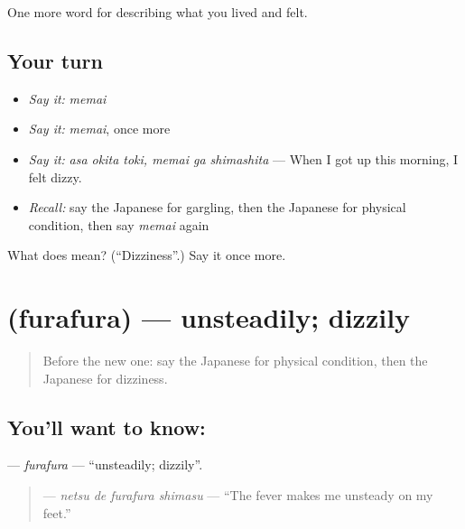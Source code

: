 \begin{grammarlens}[title={What you've built}]
One more word for describing what you lived and felt.
\end{grammarlens}

\subsection*{Your turn}
\begin{itemize}
\raggedright
  \item \emph{Say it:} \emph{memai}
  \item \emph{Say it:} \emph{memai}, once more
  \item \emph{Say it:} \emph{asa okita toki, memai ga shimashita} — When I got up this morning, I felt dizzy.
  \item \emph{Recall:} say the Japanese for gargling, then the Japanese for physical condition, then say \emph{memai} again
\end{itemize}

\begin{tcolorbox}[breakable,colback=teal!4,colframe=teal!35!black,title={Before you move on}]
What does  mean? (\textquotedblleft{}Dizziness\textquotedblright{}.) Say it once more.
\end{tcolorbox}
\section[\texorpdfstring{\ja{ふらふら} (furafura)}{ふらふら (furafura)}]{ (furafura) — unsteadily; dizzily}

\label{lesson:JA-C447-furafura}



\begin{quote}
Before the new one: say the Japanese for physical condition, then the Japanese for dizziness.
\end{quote}

\subsection*{You'll want to know: }
\textbf{} — \emph{furafura} — \textquotedblleft{}unsteadily; dizzily\textquotedblright{}.

\begin{quote}
\textbf{ } — \emph{netsu de furafura shimasu} — \textquotedblleft{}The fever makes me unsteady on my feet.\textquotedblright{}
\end{quote}

